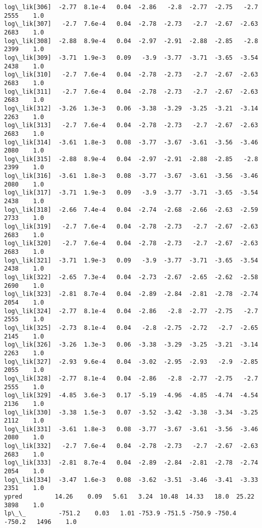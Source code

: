 \documentclass[11pt]{article}
\begin{document}
\begin{Verbatim}[commandchars=\\\{\}]
log\_lik[306]  -2.77  8.1e-4   0.04  -2.86   -2.8  -2.77  -2.75   -2.7   2555    1.0
log\_lik[307]   -2.7  7.6e-4   0.04  -2.78  -2.73   -2.7  -2.67  -2.63   2683    1.0
log\_lik[308]  -2.88  8.9e-4   0.04  -2.97  -2.91  -2.88  -2.85   -2.8   2399    1.0
log\_lik[309]  -3.71  1.9e-3   0.09   -3.9  -3.77  -3.71  -3.65  -3.54   2438    1.0
log\_lik[310]   -2.7  7.6e-4   0.04  -2.78  -2.73   -2.7  -2.67  -2.63   2683    1.0
log\_lik[311]   -2.7  7.6e-4   0.04  -2.78  -2.73   -2.7  -2.67  -2.63   2683    1.0
log\_lik[312]  -3.26  1.3e-3   0.06  -3.38  -3.29  -3.25  -3.21  -3.14   2263    1.0
log\_lik[313]   -2.7  7.6e-4   0.04  -2.78  -2.73   -2.7  -2.67  -2.63   2683    1.0
log\_lik[314]  -3.61  1.8e-3   0.08  -3.77  -3.67  -3.61  -3.56  -3.46   2080    1.0
log\_lik[315]  -2.88  8.9e-4   0.04  -2.97  -2.91  -2.88  -2.85   -2.8   2399    1.0
log\_lik[316]  -3.61  1.8e-3   0.08  -3.77  -3.67  -3.61  -3.56  -3.46   2080    1.0
log\_lik[317]  -3.71  1.9e-3   0.09   -3.9  -3.77  -3.71  -3.65  -3.54   2438    1.0
log\_lik[318]  -2.66  7.4e-4   0.04  -2.74  -2.68  -2.66  -2.63  -2.59   2733    1.0
log\_lik[319]   -2.7  7.6e-4   0.04  -2.78  -2.73   -2.7  -2.67  -2.63   2683    1.0
log\_lik[320]   -2.7  7.6e-4   0.04  -2.78  -2.73   -2.7  -2.67  -2.63   2683    1.0
log\_lik[321]  -3.71  1.9e-3   0.09   -3.9  -3.77  -3.71  -3.65  -3.54   2438    1.0
log\_lik[322]  -2.65  7.3e-4   0.04  -2.73  -2.67  -2.65  -2.62  -2.58   2690    1.0
log\_lik[323]  -2.81  8.7e-4   0.04  -2.89  -2.84  -2.81  -2.78  -2.74   2054    1.0
log\_lik[324]  -2.77  8.1e-4   0.04  -2.86   -2.8  -2.77  -2.75   -2.7   2555    1.0
log\_lik[325]  -2.73  8.1e-4   0.04   -2.8  -2.75  -2.72   -2.7  -2.65   2145    1.0
log\_lik[326]  -3.26  1.3e-3   0.06  -3.38  -3.29  -3.25  -3.21  -3.14   2263    1.0
log\_lik[327]  -2.93  9.6e-4   0.04  -3.02  -2.95  -2.93   -2.9  -2.85   2055    1.0
log\_lik[328]  -2.77  8.1e-4   0.04  -2.86   -2.8  -2.77  -2.75   -2.7   2555    1.0
log\_lik[329]  -4.85  3.6e-3   0.17  -5.19  -4.96  -4.85  -4.74  -4.54   2136    1.0
log\_lik[330]  -3.38  1.5e-3   0.07  -3.52  -3.42  -3.38  -3.34  -3.25   2112    1.0
log\_lik[331]  -3.61  1.8e-3   0.08  -3.77  -3.67  -3.61  -3.56  -3.46   2080    1.0
log\_lik[332]   -2.7  7.6e-4   0.04  -2.78  -2.73   -2.7  -2.67  -2.63   2683    1.0
log\_lik[333]  -2.81  8.7e-4   0.04  -2.89  -2.84  -2.81  -2.78  -2.74   2054    1.0
log\_lik[334]  -3.47  1.6e-3   0.08  -3.62  -3.51  -3.46  -3.41  -3.33   2351    1.0
ypred         14.26    0.09   5.61   3.24  10.48  14.33   18.0  25.22   3898    1.0
lp\_\_         -751.2    0.03   1.01 -753.9 -751.5 -750.9 -750.4 -750.2   1496    1.0


\end{Verbatim}
\end{document}
